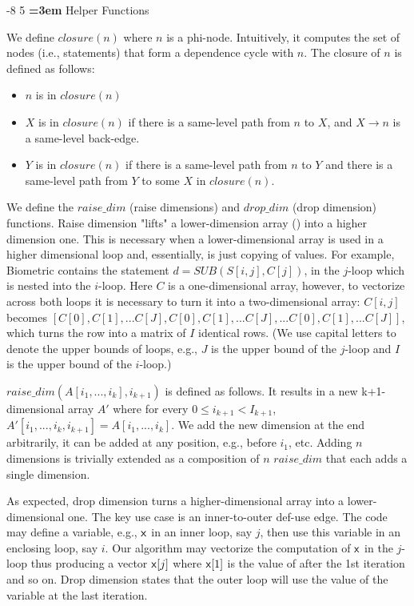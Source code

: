 \documentclass[sigconf, screen, natbib=false, dvipsnames, table]{acmart}
\makeatletter
\renewcommand{\subsection}{\@startsection{subsection}{2}{\z@}%
                        {-8\p@ \@plus -4\p@ \@minus -4\p@}%
                        {5\p@ \@plus 2\p@ \@minus 2\p@}%
                        {\normalfont\Large\bfseries\boldmath
                         \rightskip=\z@ \@plus 3em\pretolerance=10000 }}
\theoremstyle{definition}
\makeatother
\begin{document}
\subsection{Helper Functions}

We define $\mathit{closure}(n)$ where $n$ is a phi-node. Intuitively, it computes the set of nodes (i.e., statements) that form a dependence cycle with $n$.  The closure of $n$ is defined as follows:
\begin{itemize}
\item $n$ is in $\mathit{closure}(n)$
\item $X$ is in $\mathit{closure}(n)$ if there is a same-level path from $n$ to $X$, and $X \rightarrow n$ is a same-level back-edge.
\item $Y$ is in $\mathit{closure}(n)$ if there is a same-level path from $n$ to $Y$ and there is a same-level path from $Y$ to some $X$ in $\mathit{closure}(n)$.
\end{itemize}

We define the $\mathit{raise\_dim}$ (raise dimensions) and $\mathit{drop\_dim}$ (drop dimension) functions. Raise dimension "lifts" a lower-dimension array () into a higher dimension one. This is necessary when a lower-dimensional array is used in a higher dimensional loop and, essentially, is just copying of values. For example, Biometric contains the statement $d = \mathit{SUB}(S[i, j], C[j])$, in the $j$-loop which is nested into the $i$-loop. Here $C$ is a one-dimensional array, however, to vectorize across both loops it is necessary to turn it into a two-dimensional array: $C[i,j]$ becomes $[C[0],C[1],...C[J],C[0],C[1],...C[J], ... C[0],C[1],...C[J]]$, which turns the row into a matrix of $I$ identical rows. (We use capital letters to denote the upper bounds of loops, e.g., $J$ is the upper bound of the $j$-loop and $I$ is the upper bound of the $i$-loop.)

$\mathit{raise\_dim}(A[i_1,...,i_k],i_{k+1})$ is defined as follows. It results in a new {k+1}-dimensional array $A'$ where for every $0\le i_{k+1} < I_{k+1}$, $A'[i_1,...,i_k,i_{k+1}] = A[i_1,...,i_k]$. We add the new dimension at the end arbitrarily, it can be added at any position, e.g., before $i_1$, etc. Adding $n$ dimensions is trivially extended as a composition of $n$ $\mathit{raise\_dim}$ that each adds a single dimension.

As expected, drop dimension turns a higher-dimensional array into a lower-dimensional one. The key use case is an inner-to-outer def-use edge. The code may define a variable, e.g., ${\sf {x}}$ in an inner loop, say $j$, then use this variable in an enclosing loop, say $i$. Our algorithm may vectorize the computation of ${\sf {x}}$ in the $j$-loop thus producing a vector ${\sf {x}}[j]$ where ${\sf {x}}[1]$ is the value of \x after the 1st iteration and so on. Drop dimension states that the outer loop will use the value of the variable at the last iteration.
\end{document}

